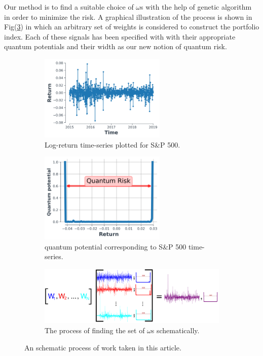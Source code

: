 \documentclass[ aip,jmp,reprint]{revtex4-2}
\begin{document}
Our method is to find a suitable choice of $\omega$s with the help of genetic algorithm in order to 
minimize the risk. 
A graphical illustration of the process is shown in Fig(\ref{fig:sub3}) in which an arbitrary set of weights is considered to construct the portfolio index. Each of these signals has been specified with with their appropriate quantum potentials and their width as our new notion of quantum risk.\\
\begin{figure}[htb]
	\centering
	\begin{subfigure}{0.5\textwidth}
		\centering
		\includegraphics[width=60mm]{fig0a.png}
		\caption{Log-return time-series plotted for S\&P 500.}
		\label{fig:sub1}
	\end{subfigure}%
	\begin{subfigure}{0.5\textwidth}
		\centering
		\includegraphics[width=60mm]{fig0_b.png}
		\caption{quantum potential corresponding to S\&P 500 time-series. }
		\label{fig:sub2}
	\end{subfigure}
	\begin{subfigure}{\textwidth}
		\centering
		\includegraphics[width=120mm]{new1_fig0.png}
		\caption{The process of finding the set of $\omega$s schematically.}
		\label{fig:sub3}
	\end{subfigure}
	\caption{An schematic process of work taken in this article.}
	\label{fig:1}
\end{figure}
\end{document}
